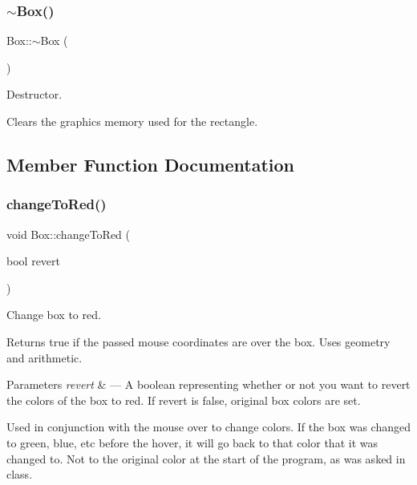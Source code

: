 \subsubsection{\texorpdfstring{$\sim$\+Box()}{~Box()}}
{\footnotesize\ttfamily Box\+::$\sim$\+Box (\begin{DoxyParamCaption}{ }\end{DoxyParamCaption})}



Destructor. 

Clears the graphics memory used for the rectangle. 

\subsection{Member Function Documentation}
\mbox{\label{class_box_ae3085bbd9ff85fc73fab17cc3cb921ac}} 
\subsubsection{\texorpdfstring{change\+To\+Red()}{changeToRed()}}
{\footnotesize\ttfamily void Box\+::change\+To\+Red (\begin{DoxyParamCaption}\item[{bool}]{revert }\end{DoxyParamCaption})}



Change box to red. 

Returns true if the passed mouse coordinates are over the box. Uses geometry and arithmetic.


\begin{DoxyParams}{Parameters}
{\em revert} & --- A boolean representing whether or not you want to revert the colors of the box to red. If revert is false, original box colors are set.\\
\hline
\end{DoxyParams}
Used in conjunction with the mouse over to change colors. If the box was changed to green, blue, etc before the hover, it will go back to that color that it was changed to. Not to the original color at the start of the program, as was asked in class. \mbox{\label{class_box_a42ae1534ed54148e5267cffe3f0862e3}} 
